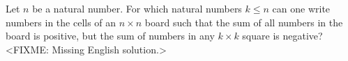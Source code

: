 \problem
Let $n$ be a natural number.
For which natural numbers $k \leq n$ can one write numbers in the cells of an
$n \times n$ board such that the sum of all numbers in the board is positive,
but the sum of numbers in any $k \times k$ square is negative?
\solution
<FIXME: Missing English solution.>
\endproblem

